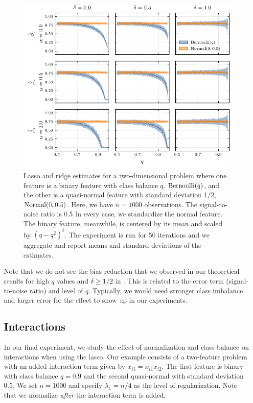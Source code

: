 \begin{figure}[htpb]
  \centering
  \includegraphics{plots/mixed_data.pdf}
  \caption{%
    Lasso and ridge estimates for a two-dimensional problem where one feature is a binary feature with class balance \(q\), \(\operatorname{Bernoulli}(q)\), and the other is a quasi-normal feature with standard deviation 1/2, \(\operatorname{Normal}(0, 0.5)\). Here, we have \(n = \num{1000}\) observations. The signal-to-noise ratio is 0.5 In every case, we standardize the normal feature. The binary feature, meanwhile, is centered by its mean and scaled by \((q-q^2)^\delta\). The experiment is run for 50 iterations and we aggregate and report means and standard deviations of the estimates.}
  \label{fig:lasso-ridge-comparison}
\end{figure}

Note that we do not see the bias reduction that we observed in our theoretical results for high \(q\) values and \(\delta \geq 1/2\) in . This is related to the error term (signal-to-noise ratio) and level of \(q\). Typically, we would need stronger class imbalance and larger error for the effect to show up in our experiments.

\subsection{Interactions}\label{sec:experiments-interactions}

In our final experiment, we study the effect of normalization and class balance on interactions when using the lasso. Our example consists of a two-feature problem with an added interaction term given by \(x_{i3} = x_{i1}x_{i2}\). The first feature is binary with class balance \(q=0.9\) and the second quasi-normal with standard deviation 0.5. We set \(n=1000\) and specify \(\lambda_1 = n/4\) as the level of regularization. Note that we normalize \emph{after} the interaction term is added.

